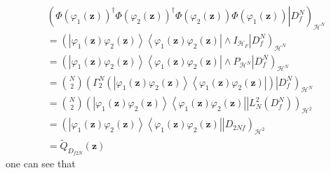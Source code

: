 \documentclass[aps,preprint]{revtex4}%
\begin{document}
\begin{align}
&  \left(  \left.  \Phi\left(  \varphi_{1}\left(  \mathbf{z}\right)  \right)
^{\dagger}\Phi\left(  \varphi_{2}\left(  \mathbf{z}\right)  \right)
^{\dagger}\Phi\left(  \varphi_{2}\left(  \mathbf{z}\right)  \right)
\Phi\left(  \varphi_{1}\left(  \mathbf{z}\right)  \right)  \right\vert
D_{f}^{N}\right)  _{\mathcal{H}^{N}}\nonumber\\
&  =\left(  \left.  \left\vert \varphi_{1}\left(  \mathbf{z}\right)
\varphi_{2}\left(  \mathbf{z}\right)  \right\rangle \left\langle \varphi
_{1}\left(  \mathbf{z}\right)  \varphi_{2}\left(  \mathbf{z}\right)
\right\vert \wedge I_{\mathcal{H}_{F}}\right\vert D_{f}^{N}\right)
_{\mathcal{H}^{N}}\nonumber\\
&  =\left(  \left.  \left\vert \varphi_{1}\left(  \mathbf{z}\right)
\varphi_{2}\left(  \mathbf{z}\right)  \right\rangle \left\langle \varphi
_{1}\left(  \mathbf{z}\right)  \varphi_{2}\left(  \mathbf{z}\right)
\right\vert \wedge P_{\mathcal{H}^{N}}\right\vert D_{f}^{N}\right)
_{\mathcal{H}^{N}}\nonumber\\
&  =\binom{N}{2}\left(  \left.  \Gamma_{2}^{N}\left(  \left\vert \varphi
_{1}\left(  \mathbf{z}\right)  \varphi_{2}\left(  \mathbf{z}\right)
\right\rangle \left\langle \varphi_{1}\left(  \mathbf{z}\right)  \varphi
_{2}\left(  \mathbf{z}\right)  \right\vert \right)  \right\vert D_{f}%
^{N}\right)  _{\mathcal{H}^{N}}\nonumber\\
&  =\binom{N}{2}\left(  \left.  \left\vert \varphi_{1}\left(  \mathbf{z}%
\right)  \varphi_{2}\left(  \mathbf{z}\right)  \right\rangle \left\langle
\varphi_{1}\left(  \mathbf{z}\right)  \varphi_{2}\left(  \mathbf{z}\right)
\right\vert \right\vert L_{N}^{2}\left(  D_{f}^{N}\right)  \right)
_{\mathcal{H}^{2}}\nonumber\\
&  =\left(  \left.  \left\vert \varphi_{1}\left(  \mathbf{z}\right)
\varphi_{2}\left(  \mathbf{z}\right)  \right\rangle \left\langle \varphi
_{1}\left(  \mathbf{z}\right)  \varphi_{2}\left(  \mathbf{z}\right)
\right\vert \right\vert D_{2Nf}\right)  _{\mathcal{H}^{2}}\\
&  =\tilde{Q}_{D_{f2N}}\left(  \mathbf{z}\right)
\end{align}
one can see that
\end{document}
